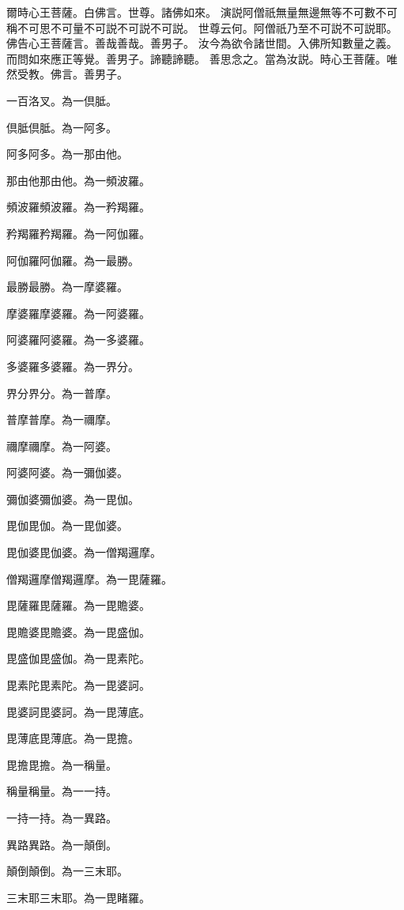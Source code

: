 \makeatletter
爾時心王菩薩。白佛言。世尊。諸佛如來。
演説阿僧祇無量無邊無等不可數不可稱不可思不可量不可説不可説不可説。
世尊云何。阿僧祇乃至不可説不可説耶。佛告心王菩薩言。善哉善哉。善男子。
汝今為欲令諸世間。入佛所知數量之義。而問如來應正等覺。善男子。諦聽諦聽。
善思念之。當為汝説。時心王菩薩。唯然受教。佛言。善男子。\par
一百洛叉。為一倶胝。\par
倶胝倶胝。為一阿\xksj@YU 多。\par
阿\xksj@YU 多阿\xksj@YU 多。為一那由他。\par
那由他那由他。為一頻波羅。\par
頻波羅頻波羅。為一矜羯羅。\par
矜羯羅矜羯羅。為一阿伽羅。\par
阿伽羅阿伽羅。為一最勝。\par
最勝最勝。為一摩婆羅。\par
摩婆羅摩婆羅。為一阿婆羅。\par
阿婆羅阿婆羅。為一多婆羅。\par
多婆羅多婆羅。為一界分。\par
界分界分。為一普摩。\par
普摩普摩。為一禰摩。\par
禰摩禰摩。為一阿婆\xksj@KEN 。\par
阿婆\xksj@KEN 阿婆\xksj@KEN 。為一彌伽婆。\par
彌伽婆彌伽婆。為一毘\xksj@RA 伽。\par
毘\xksj@RA 伽毘\xksj@RA 伽。為一毘伽婆。\par
毘伽婆毘伽婆。為一僧羯邏摩。\par
僧羯邏摩僧羯邏摩。為一毘薩羅。\par
毘薩羅毘薩羅。為一毘贍婆。\par
毘贍婆毘贍婆。為一毘盛伽。\par
毘盛伽毘盛伽。為一毘素陀。\par
毘素陀毘素陀。為一毘婆訶。\par
毘婆訶毘婆訶。為一毘薄底。\par
毘薄底毘薄底。為一毘\xksj@KYA 擔。\par
毘\xksj@KYA 擔毘\xksj@KYA 擔。為一稱量。\par
稱量稱量。為一一持。\par
一持一持。為一異路。\par
異路異路。為一顛倒。\par
顛倒顛倒。為一三末耶。\par
三末耶三末耶。為一毘睹羅。\par
